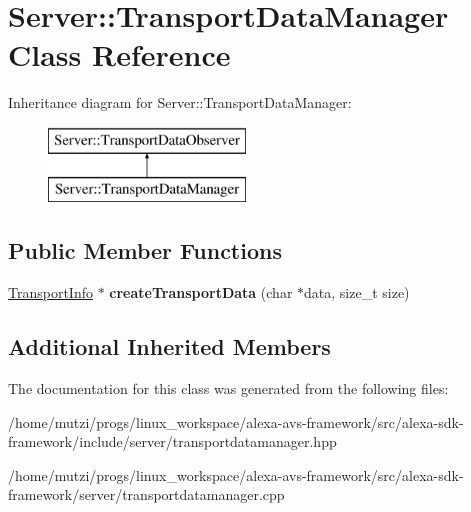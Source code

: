 \hypertarget{classServer_1_1TransportDataManager}{}\section{Server\+:\+:Transport\+Data\+Manager Class Reference}
\label{classServer_1_1TransportDataManager}
Inheritance diagram for Server\+:\+:Transport\+Data\+Manager\+:\begin{figure}[H]
\begin{center}
\leavevmode
\includegraphics[height=2.000000cm]{d9/d4f/classServer_1_1TransportDataManager}
\end{center}
\end{figure}
\subsection*{Public Member Functions}
\begin{DoxyCompactItemize}
\item 
\mbox{\label{classServer_1_1TransportDataManager_aac347cb4dfa81d1c03428a80b20f14b3}} 
\hyperlink{classAlexaEvent_1_1TransportInfo}{Transport\+Info} $\ast$ {\bfseries create\+Transport\+Data} (char $\ast$data, size\+\_\+t size)
\end{DoxyCompactItemize}
\subsection*{Additional Inherited Members}


The documentation for this class was generated from the following files\+:\begin{DoxyCompactItemize}
\item 
/home/mutzi/progs/linux\+\_\+workspace/alexa-\/avs-\/framework/src/alexa-\/sdk-\/framework/include/server/transportdatamanager.\+hpp\item 
/home/mutzi/progs/linux\+\_\+workspace/alexa-\/avs-\/framework/src/alexa-\/sdk-\/framework/server/transportdatamanager.\+cpp\end{DoxyCompactItemize}
